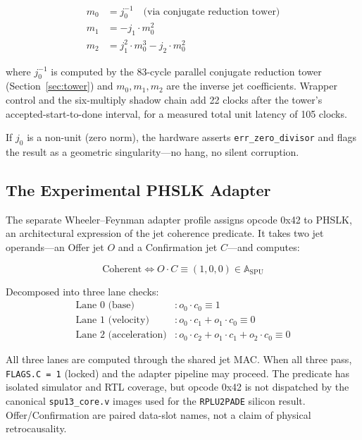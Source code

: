\documentclass[conference]{IEEEtran}
\begin{document}
\begin{align}
m_0 &= j_0^{-1} \quad\text{(via conjugate reduction tower)} \\
	m_1 &= -j_1 \cdot m_0^2 \\
	m_2 &= j_1^2 \cdot m_0^3 - j_2 \cdot m_0^2
\end{align}

where $j_0^{-1}$ is computed by the 83-cycle parallel conjugate reduction tower
(Section~\ref{sec:tower}) and $m_0, m_1, m_2$ are the inverse jet
coefficients. Wrapper control and the six-multiply shadow chain add 22 clocks
after the tower's accepted-start-to-done interval, for a measured total unit
latency of 105 clocks.

	If $j_0$ is a non-unit (zero norm), the hardware asserts \texttt{err\_zero\_divisor}
and flags the result as a geometric singularity---no hang, no silent corruption.

\subsection{The Experimental PHSLK Adapter}

The separate Wheeler--Feynman adapter profile assigns opcode 0x42 to PHSLK,
an architectural expression of the jet coherence predicate. It takes two jet
operands---an Offer jet $O$ and a Confirmation jet $C$---and computes:

\begin{equation}
\text{Coherent} \iff O \cdot C \equiv (1, 0, 0) \in \mathbb{A}_{\text{SPU}}
\end{equation}

Decomposed into three lane checks:
\begin{align}
\text{Lane 0 (base)} &: o_0 \cdot c_0 \equiv 1 \\
\text{Lane 1 (velocity)} &: o_0 \cdot c_1 + o_1 \cdot c_0 \equiv 0 \\
\text{Lane 2 (acceleration)} &: o_0 \cdot c_2 + o_1 \cdot c_1 + o_2 \cdot c_0 \equiv 0
\end{align}

All three lanes are computed through the shared jet MAC. When all three
pass, \texttt{FLAGS.C = 1} (locked) and the adapter pipeline may proceed.
The predicate has isolated simulator and RTL coverage, but opcode 0x42 is not
dispatched by the canonical \texttt{spu13\_core.v} images used for the
\texttt{RPLU2PADE} silicon result. Offer/Confirmation are paired data-slot
names, not a claim of physical retrocausality.
\end{document}
